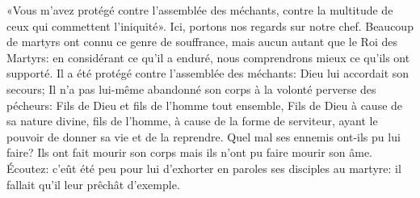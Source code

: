 «Vous m’avez protégé contre l’assemblée des méchants,
	contre la multitude de ceux qui commettent l’iniquité».
Ici, portons nos regards sur notre chef.
Beaucoup de martyrs ont connu ce genre de souffrance,
	mais aucun autant que le Roi des Martyrs:
	en considérant ce qu’il a enduré,
	nous comprendrons mieux ce qu’ils ont supporté.
Il a été protégé contre l’assemblée des méchants:
	Dieu lui accordait son secours;
	Il n’a pas lui-même abandonné son corps à la volonté perverse des pécheurs:
	Fils de Dieu et fils de l’homme tout ensemble,
	Fils de Dieu à cause de sa nature divine,
	fils de l’homme, à cause de la forme de serviteur,
	ayant le pouvoir de donner sa vie et de la reprendre.
Quel mal ses ennemis ont-ils pu lui faire?
	Ils ont fait mourir son corps mais ils n’ont pu faire mourir son âme.
Écoutez: c’eût été peu pour lui d’exhorter en paroles ses disciples au martyre:
	il fallait qu’il leur prêchât d’exemple.
